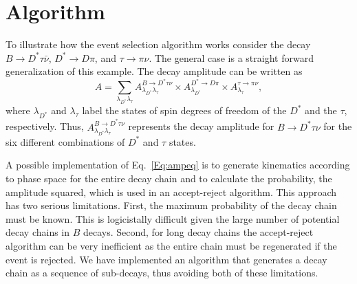 
\section{Algorithm}
\label{sect:algorithm}


To illustrate how the event selection algorithm works
consider the decay 
$B\rightarrow D^{*} \tau \bar\nu$,
$D^* \rightarrow D\pi$, and $\tau \to \pi \nu$.
The general case is a straight forward generalization of 
this example. The decay amplitude can be written as
\def\AmpB{A^{B\rightarrow D^*\tau\nu}_{\lambda_{D^*}\lambda_{\tau}}}
\def\AmpDstar{A^{D^*\rightarrow D\pi}_{\lambda_{D^*}}}
\def\Amptau{A^{\tau\rightarrow \pi\nu}_{\lambda_{\tau}}}
\begin{equation}
A=\sum_{\lambda_{D^*}\lambda_{\tau}}\AmpB
\times \AmpDstar
\times \Amptau,
\label{Eq:ampeq}
\end{equation}
where $\lambda^{\phantom '}_{D^*}$ and $\lambda^{\phantom '}_{\tau}$ label the states of spin degrees of freedom of the
$D^{*}$ and the $\tau$, respectively. Thus, 
$\AmpB$ represents the decay amplitude for $B \to D^* \tau \nu$
for the six different combinations of $D^*$ and
$\tau$ states. 

A possible implementation of Eq.~\ref{Eq:ampeq} is to generate kinematics according to phase
space for the entire decay chain and to calculate the probability,
the amplitude squared, which is 
used in an accept-reject algorithm.  This approach has two serious
limitations.  First, the maximum probability of the decay chain
must be known.  This is logicistally difficult given the large
number of potential decay chains in $B$ decays.  Second, for long
decay chains the accept-reject algorithm can be very inefficient as
the entire chain must be regenerated if the event is rejected. 
We have implemented an algorithm that generates a decay chain as a 
sequence of sub-decays, thus avoiding both of these limitations.

